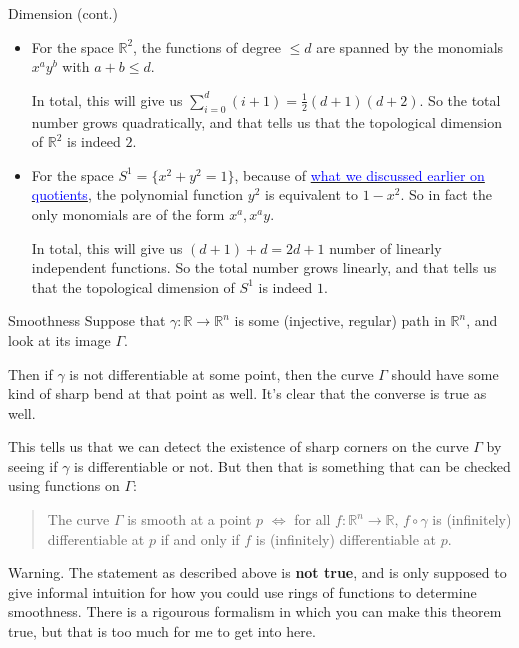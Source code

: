 \documentclass[aspectratio=169,10pt]{beamer}
\begin{document}
\begin{frame}{Dimension (cont.)}
    \begin{itemize}
        \item For the space $\mathbb{R}^2$, the functions of degree $\leq d$ are spanned by the monomials $x^a y^b$ with $a + b \leq d$.
        
        In total, this will give us $\sum_{i=0}^d (i+1) = \frac{1}{2} (d+1)(d+2)$. So the total number grows quadratically, and that tells us that the topological dimension of $\mathbb{R}^2$ is indeed $2$.

        \pause
        \item For the space $S^1 = \{x^2 + y^2 = 1\}$, because of \hyperlink{Quotients}{\textcolor{blue}{what we discussed earlier on quotients}}, the polynomial function $y^2$ is equivalent to $1-x^2$. So in fact the only monomials are of the form $x^a, x^a y$.

        In total, this will give us $(d+1) + d= 2d+1$ number of linearly independent functions. So the total number grows linearly, and that tells us that the topological dimension of $S^1$ is indeed $1$.
    \end{itemize}
\end{frame}


\begin{frame}{Smoothness}
    Suppose that $\gamma:\mathbb{R}\to\mathbb{R}^n$ is some (injective, regular) path in $\mathbb{R}^n$, and look at its image $\Gamma$.
        
    Then if $\gamma$ is not differentiable at some point, then the curve $\Gamma$ should have some kind of sharp bend at that point as well. It's clear that the converse is true as well.
    \vspace{12pt}
    
    \pause
    This tells us that we can detect the existence of sharp corners on the curve $\Gamma$ by seeing if $\gamma$ is differentiable or not. But then that is something that can be checked using functions on $\Gamma$:
        \begin{quote}
            The curve $\Gamma$ is smooth at a point $p$ $\iff$ for all $f:\mathbb{R}^n \to \mathbb{R}$, $f \circ \gamma$ is (infinitely) differentiable at $p$ if and only if $f$ is (infinitely) differentiable at $p$.
        \end{quote}

    \pause
    {\color{red}Warning.} The statement as described above is \textbf{not true}, and is only supposed to give informal intuition for how you could use rings of functions to determine smoothness. There is a rigourous formalism in which you can make this theorem true, but that is too much for me to get into here.
\end{frame}
\end{document}
